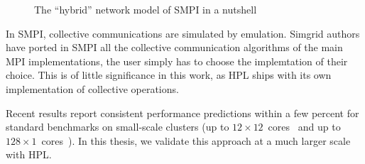        \begin{figure}[htpb]
            \centering
            \caption{The ``hybrid'' network model of SMPI in a nutshell~\cite{smpi}}%
            \label{fig:smpi_model}
        \end{figure}

        In SMPI, collective communications are simulated by emulation. Simgrid authors have ported in SMPI all the
        collective communication algorithms of the main MPI implementations, the user simply has to choose the
        implemtation of their choice. This is of little significance in this work, as HPL ships with its own
        implementation of collective operations.

        Recent results report consistent performance predictions within a few percent for standard benchmarks on
        small-scale clusters (up to \(12\times12\) cores~\cite{heinrich:hal-01523608} and up to
        \(128\times1\) cores~\cite{smpi}). In this thesis, we validate this approach at a much larger scale with HPL.

